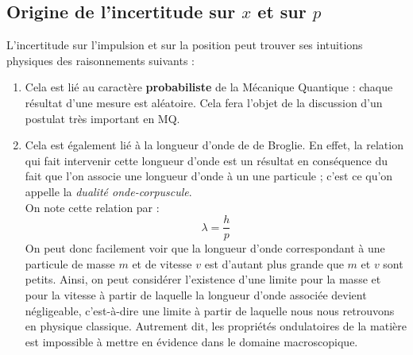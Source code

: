 \documentclass[../Notes de cours]{subfiles}
\begin{document}

\subsection{Origine de l'incertitude sur $x$ et sur $p$}
L'incertitude sur l'impulsion et sur la position peut trouver ses intuitions physiques des raisonnements suivants :
\begin{enumerate}
    \item Cela est lié au caractère \textbf{probabiliste} de la Mécanique Quantique : chaque résultat d'une mesure est aléatoire. Cela fera l'objet de la discussion d'un postulat très important en MQ. 
    \item Cela est également lié à la longueur d'onde de de Broglie. En effet, la relation qui fait intervenir cette longueur d'onde est un résultat en conséquence du fait que l'on associe une longueur d'onde à un une particule ; c'est ce qu'on appelle la \textit{dualité onde-corpuscule}. \\
    On note cette relation par : 
    \begin{equation}
    \label{Broglie}
    \lambda = \frac{h}{p}
    \end{equation}
    On peut donc facilement voir que la longueur d'onde correspondant à une particule de masse $m$ et de vitesse $v$ est d'autant plus grande que $m$ et $v$ sont petits. Ainsi, on peut considérer l'existence d'une limite pour la masse et pour la vitesse à partir de laquelle la longueur d'onde associée devient négligeable, c'est-à-dire une limite à partir de laquelle nous nous retrouvons en physique classique. Autrement dit, les propriétés ondulatoires de la matière est impossible à mettre en évidence dans le domaine macroscopique.  \\
\end{enumerate}
\end{document}
